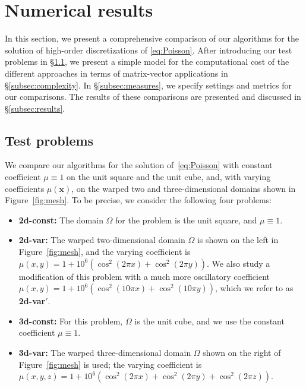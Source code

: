 \documentclass[times]{nlaauth}
\newcommand{\bs}[1]{\ensuremath{\boldsymbol #1}}
\begin{document}
\section{Numerical results}\label{sec:numerics}
In this section, we present a comprehensive comparison of our
algorithms for the solution of high-order discretizations of
\eqref{eq:Poisson}.  After introducing our test problems in
\S\ref{subsec:tests}, we present a simple model for the computational
cost of the different approaches in terms of matrix-vector
applications in \S\ref{subsec:complexity}. In \S\ref{subsec:measures},
we specify settings and metrics for our comparisons. The results of
these comparisons are presented and discussed in
\S\ref{subsec:results}.


\subsection{Test problems}\label{subsec:tests}
We compare our algorithms for the solution of~\eqref{eq:Poisson} with
constant coefficient $\mu\equiv 1$ on the unit square and the unit cube,
and, with varying coefficients $\mu(\bs x)$, on the warped two and
three-dimensional domains shown in Figure~\ref{fig:mesh}. To be
precise, we consider the following four problems:
\begin{itemize}
\item {\bf 2d-const:} The domain $\Omega$ for the problem is the unit square, and $\mu\equiv
  1$.
\item {\bf 2d-var:} The warped two-dimensional domain $\Omega$ is
  shown on the left in Figure~\ref{fig:mesh}, and the varying
  coefficient is $\mu(x,y) = 1 + 10^6(\cos^2(2\pi x) + \cos^2(2\pi
  y))$. We also study a modification of this problem with a much more
  oscillatory coefficient
  $\mu(x,y) = 1 + 10^6(\cos^2(10\pi x) +
  \cos^2(10\pi y))$, which we refer to as {\bf 2d-var$'$}.
\item {\bf 3d-const:} For this problem, $\Omega$ is the unit cube,
  and we use the constant coefficient $\mu\equiv 1$.
\item {\bf 3d-var:} The warped three-dimensional domain $\Omega$
  shown on the right of Figure~\ref{fig:mesh} is used; the
  varying coefficient is $\mu(x,y,z) = 1 + 10^6(\cos^2(2\pi x) +
  \cos^2(2\pi y) + \cos^2(2\pi z))$.
\end{itemize}
\end{document}

